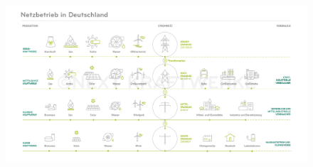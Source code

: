 \documentclass[aspectratio=1610, professionalfonts, 9pt]{beamer}
\begin{document}
{
\begin{frame}
\begin{figure}
  \includegraphics[width=1\textwidth]{images/netzbetrieb-deutsches-stromnetz.jpg}
\end{figure}
\end{frame}
}
\end{document}
